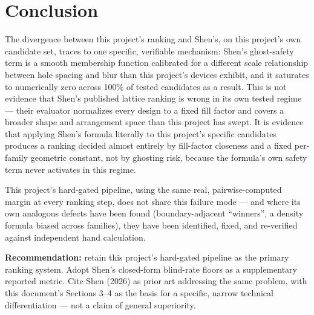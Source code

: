 \section{Conclusion}

The divergence between this project's ranking and Shen's, on this
project's own candidate set, traces to one specific, verifiable mechanism:
Shen's ghost-safety term is a smooth membership function calibrated for a
different scale relationship between hole spacing and blur than this
project's devices exhibit, and it saturates to numerically zero across
100\% of tested candidates as a result. This is not evidence that Shen's
published lattice ranking is wrong in its own tested regime --- their
evaluator normalizes every design to a fixed fill factor and covers a
broader shape and arrangement space than this project has swept. It is
evidence that applying Shen's formula literally to this project's specific
candidates produces a ranking decided almost entirely by fill-factor
closeness and a fixed per-family geometric constant, not by ghosting risk,
because the formula's own safety term never activates in this regime.

This project's hard-gated pipeline, using the same real, pairwise-computed
margin at every ranking step, does not share this failure mode --- and
where its own analogous defects have been found (boundary-adjacent
``winners'', a density formula biased across families), they have been
identified, fixed, and re-verified against independent hand calculation.

\textbf{Recommendation:} retain this project's hard-gated pipeline as the
primary ranking system. Adopt Shen's closed-form blind-rate floors as a
supplementary reported metric. Cite Shen (2026) as prior art addressing the
same problem, with this document's Sections 3--4 as the basis for a
specific, narrow technical differentiation --- not a claim of general
superiority.


